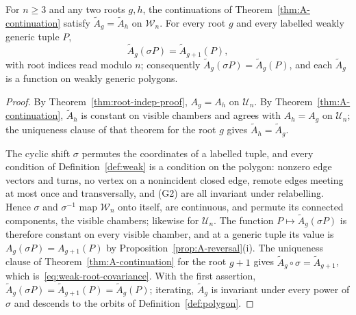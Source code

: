 \begin{corollary}\label{cor:weak-root-indep}
For $n\geq3$ and any two roots $g,h$, the continuations of
Theorem~\ref{thm:A-continuation} satisfy $\widetilde A_g=\widetilde A_h$ on
$\mathcal W_n$. For every root $g$ and every labelled weakly generic tuple
$P$,
\begin{equation}\label{eq:weak-root-covariance}
\widetilde A_g(\sigma P)=\widetilde A_{g+1}(P),
\end{equation}
with root indices read modulo $n$; consequently
$\widetilde A_g(\sigma P)=\widetilde A_g(P)$, and each $\widetilde A_g$ is
a function on weakly generic polygons.
\end{corollary}
\begin{proof}
By Theorem~\ref{thm:root-indep-proof}, $A_g=A_h$ on $\mathcal U_n$. By
Theorem~\ref{thm:A-continuation}, $\widetilde A_h$ is constant on visible
chambers and agrees with $A_h=A_g$ on $\mathcal U_n$; the uniqueness clause
of that theorem for the root $g$ gives $\widetilde A_h=\widetilde A_g$.

The cyclic shift $\sigma$ permutes the coordinates of a labelled tuple, and
every condition of Definition~\ref{def:weak} is a condition on the polygon:
nonzero edge vectors and turns, no vertex on a nonincident closed edge,
remote edges meeting at most once and transversally, and (G2) are all
invariant under relabelling. Hence $\sigma$ and $\sigma^{-1}$ map
$\mathcal W_n$ onto itself, are continuous, and permute its connected
components, the visible chambers; likewise for $\mathcal U_n$. The
function $P\mapsto\widetilde A_g(\sigma P)$ is therefore constant on every
visible chamber, and at a generic tuple its value is
$A_g(\sigma P)=A_{g+1}(P)$ by Proposition~\ref{prop:A-reversal}(i). The
uniqueness clause of Theorem~\ref{thm:A-continuation} for the root $g+1$
gives $\widetilde A_g\circ\sigma=\widetilde A_{g+1}$, which
is~\eqref{eq:weak-root-covariance}. With the first assertion,
$\widetilde A_g(\sigma P)=\widetilde A_{g+1}(P)=\widetilde A_g(P)$;
iterating, $\widetilde A_g$ is invariant under every power of $\sigma$ and
descends to the orbits of Definition~\ref{def:polygon}.
\end{proof}

